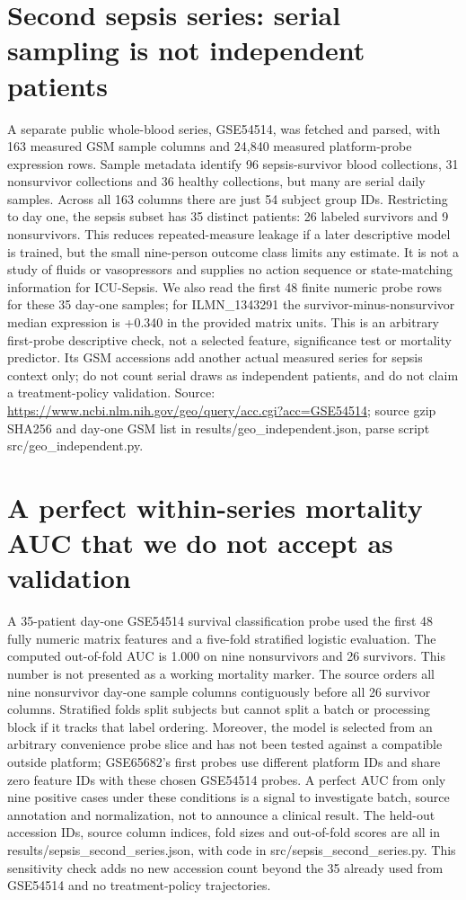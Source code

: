 \section{Second sepsis series: serial sampling is not independent patients}
A separate public whole-blood series, GSE54514, was fetched and parsed, with 163 measured GSM sample columns and 24,840 measured platform-probe expression rows. Sample metadata identify 96 sepsis-survivor blood collections, 31 nonsurvivor collections and 36 healthy collections, but many are serial daily samples. Across all 163 columns there are just 54 subject group IDs. Restricting to day one, the sepsis subset has 35 distinct patients: 26 labeled survivors and 9 nonsurvivors. This reduces repeated-measure leakage if a later descriptive model is trained, but the small nine-person outcome class limits any estimate. It is not a study of fluids or vasopressors and supplies no action sequence or state-matching information for ICU-Sepsis. We also read the first 48 finite numeric probe rows for these 35 day-one samples; for ILMN\_1343291 the survivor-minus-nonsurvivor median expression is +0.340 in the provided matrix units. This is an arbitrary first-probe descriptive check, not a selected feature, significance test or mortality predictor. Its GSM accessions add another actual measured series for sepsis context only; do not count serial draws as independent patients, and do not claim a treatment-policy validation. Source: \url{https://www.ncbi.nlm.nih.gov/geo/query/acc.cgi?acc=GSE54514}; source gzip SHA256 and day-one GSM list in results/geo\_independent.json, parse script src/geo\_independent.py.

\section{A perfect within-series mortality AUC that we do not accept as validation}
A 35-patient day-one GSE54514 survival classification probe used the first 48 fully numeric matrix features and a five-fold stratified logistic evaluation. The computed out-of-fold AUC is 1.000 on nine nonsurvivors and 26 survivors. This number is not presented as a working mortality marker. The source orders all nine nonsurvivor day-one sample columns contiguously before all 26 survivor columns. Stratified folds split subjects but cannot split a batch or processing block if it tracks that label ordering. Moreover, the model is selected from an arbitrary convenience probe slice and has not been tested against a compatible outside platform; GSE65682's first probes use different platform IDs and share zero feature IDs with these chosen GSE54514 probes. A perfect AUC from only nine positive cases under these conditions is a signal to investigate batch, source annotation and normalization, not to announce a clinical result. The held-out accession IDs, source column indices, fold sizes and out-of-fold scores are all in results/sepsis\_second\_series.json, with code in src/sepsis\_second\_series.py. This sensitivity check adds no new accession count beyond the 35 already used from GSE54514 and no treatment-policy trajectories.

